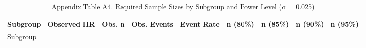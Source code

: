 \documentclass[
  letterpaper,
  DIV=11,
  numbers=noendperiod]{scrartcl}
\begin{document}
\begin{longtable}[]{@{}
  >{\raggedright\arraybackslash}p{}
  >{\raggedleft\arraybackslash}p{}
  >{\raggedleft\arraybackslash}p{}
  >{\raggedleft\arraybackslash}p{}
  >{\raggedleft\arraybackslash}p{}
  >{\raggedleft\arraybackslash}p{}
  >{\raggedleft\arraybackslash}p{}
  >{\raggedleft\arraybackslash}p{}
  >{\raggedleft\arraybackslash}p{}@{}}
\caption{Appendix Table A4. Required Sample Sizes by Subgroup and Power
Level (\(\alpha\) = 0.025)}\label{tbl-app-power-reliable}\tabularnewline
\toprule\noalign{}
\begin{minipage}[b]{\linewidth}\raggedright
Subgroup
\end{minipage} & \begin{minipage}[b]{\linewidth}\raggedleft
Observed HR
\end{minipage} & \begin{minipage}[b]{\linewidth}\raggedleft
Obs. n
\end{minipage} & \begin{minipage}[b]{\linewidth}\raggedleft
Obs. Events
\end{minipage} & \begin{minipage}[b]{\linewidth}\raggedleft
Event Rate
\end{minipage} & \begin{minipage}[b]{\linewidth}\raggedleft
n (80\%)
\end{minipage} & \begin{minipage}[b]{\linewidth}\raggedleft
n (85\%)
\end{minipage} & \begin{minipage}[b]{\linewidth}\raggedleft
n (90\%)
\end{minipage} & \begin{minipage}[b]{\linewidth}\raggedleft
n (95\%)
\end{minipage} \\
\midrule\noalign{}
\endfirsthead
\toprule\noalign{}
\begin{minipage}[b]{\linewidth}\raggedright
Subgroup
\end{minipage} & \begin{minipage}[b]{\linewidth}\raggedleft

\end{minipage}
\end{longtable}
\end{document}
